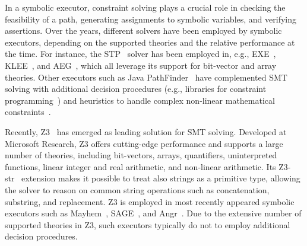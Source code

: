 
In a symbolic executor, constraint solving plays a crucial role in checking the feasibility of a path, generating assignments to symbolic variables, and verifying assertions.
%
Over the years, different solvers have been employed by symbolic executors, depending on the supported theories and the relative performance at the time. For instance, the STP~\cite{STP-CAV07} solver has been employed in, e.g., {\sc EXE}~\cite{EXE-CCS06}, {\sc KLEE}~\cite{KLEE-OSDI08}, and {\sc AEG}~\cite{AEG-NDSS11}, which all leverage its support for bit-vector and array theories. Other executors such as {\sc Java PathFinder}~\cite{PATHFINDER-ASE10} have complemented SMT solving with additional decision procedures (e.g., libraries for constraint programming~\cite{CHOCO}) and heuristics to handle complex non-linear mathematical constraints~\cite{CORAL-NFM11}.

Recently, Z3~\cite{Z3-TACS08} has emerged as leading solution for SMT solving. Developed at Microsoft Research, Z3 offers cutting-edge performance and supports a large number of theories, including bit-vectors, arrays, quantifiers, uninterpreted functions, linear integer and real arithmetic, and non-linear arithmetic. 
%
Its Z3-str~\cite{ZZG-FSE13} extension makes it possible to treat also strings as a primitive type, allowing the solver to reason on common string operations such as concatenation, substring, and replacement.
%
Z3 is employed in most recently appeared symbolic executors such as {\sc Mayhem}~\cite{MAYHEM-SP12}, {\sc SAGE}~\cite{SAGE-QUEUE12}, and {\sc Angr}~\cite{ANGR-SSP16}. Due to the extensive number of supported theories in Z3, such executors typically do not to employ additional decision procedures.

